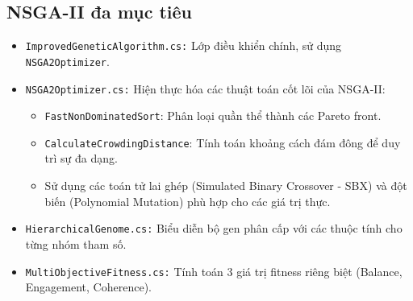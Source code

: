 \subsection{NSGA-II đa mục tiêu}
\begin{itemize}
    \item \texttt{ImprovedGeneticAlgorithm.cs:} Lớp điều khiển chính, sử dụng \texttt{NSGA2Optimizer}.
    \item \texttt{NSGA2Optimizer.cs:} Hiện thực hóa các thuật toán cốt lõi của NSGA-II:
        \begin{itemize}
            \item \texttt{FastNonDominatedSort}: Phân loại quần thể thành các Pareto front.
            \item \texttt{CalculateCrowdingDistance}: Tính toán khoảng cách đám đông để duy trì sự đa dạng.
            \item Sử dụng các toán tử lai ghép (Simulated Binary Crossover - SBX) và đột biến (Polynomial Mutation) phù hợp cho các giá trị thực.
        \end{itemize}
    \item \texttt{HierarchicalGenome.cs:} Biểu diễn bộ gen phân cấp với các thuộc tính cho từng nhóm tham số.
    \item \texttt{MultiObjectiveFitness.cs:} Tính toán 3 giá trị fitness riêng biệt (Balance, Engagement, Coherence).
\end{itemize}
